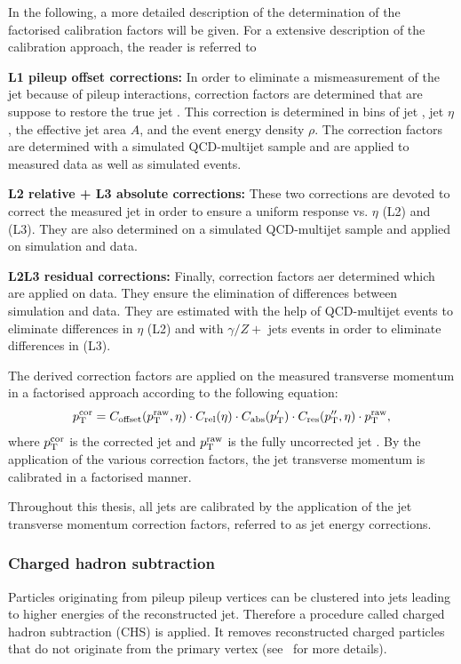In the following, a more detailed description of the determination of the factorised calibration factors will be given.
For a extensive description of the calibration approach, the reader is referred to~\cite{bib:CMS:JERCPaper_2011}
\begin{description}
\item \textbf{L1 pileup offset corrections:} In order to eliminate a mismeasurement of the jet \pt because of pileup interactions, correction factors are determined that are suppose to restore the true jet \pt. This correction is determined in bins of jet \pt, jet $\eta$, the effective jet area $A$, and the event energy density $\rho$. The correction factors are determined with a simulated QCD-multijet sample and are applied to measured data as well as simulated events.
\item \textbf{L2 relative + L3 absolute corrections:} These two corrections are devoted to correct the measured jet \pt in order to ensure a uniform response vs. $\eta$ (L2) and \pt (L3). They are also determined on a simulated QCD-multijet sample and applied on simulation and data.
\item \textbf{L2L3 residual corrections:} Finally, correction factors aer determined which are applied on data. They ensure the elimination of differences between simulation and data. They are estimated with the help of QCD-multijet events to eliminate differences in $\eta$ (L2) and with $\gamma/Z+$ jets events in order to eliminate differences in \pt (L3).\\
\end{description}

The derived correction factors are applied on the measured transverse momentum in a factorised approach according to the following equation:
\begin{equation}
p_{\text{T}}^\mathrm{cor} = C_{\mathrm{offset}}(p_{\text{T}}^\mathrm{raw}, \eta) \cdot C_{\mathrm{rel}}(\eta) \cdot C_{\mathrm{abs}}(p_{\text{T}}') \cdot C_\mathrm{res}(p_{\text{T}}'', \eta) \cdot p_{\text{T}}^\mathrm{raw},
\end{equation}
where $p_{\text{T}}^\mathrm{cor}$ is the corrected jet \pt and  $p_{\text{T}}^\mathrm{raw}$ is the fully uncorrected jet \pt.
By the application of the various correction factors, the jet transverse momentum is calibrated in a factorised manner.

Throughout this thesis, all jets are calibrated by the application of the jet transverse momentum correction factors, referred to as jet energy corrections.


\subsubsection*{Charged hadron subtraction}
Particles originating from pileup pileup vertices can be clustered into jets leading to higher energies of the reconstructed jet.
Therefore a procedure called charged hadron subtraction (CHS) is applied.
It removes reconstructed charged particles that do not originate from the primary vertex (see~\cite{bib:CHS_2012} for more details).

